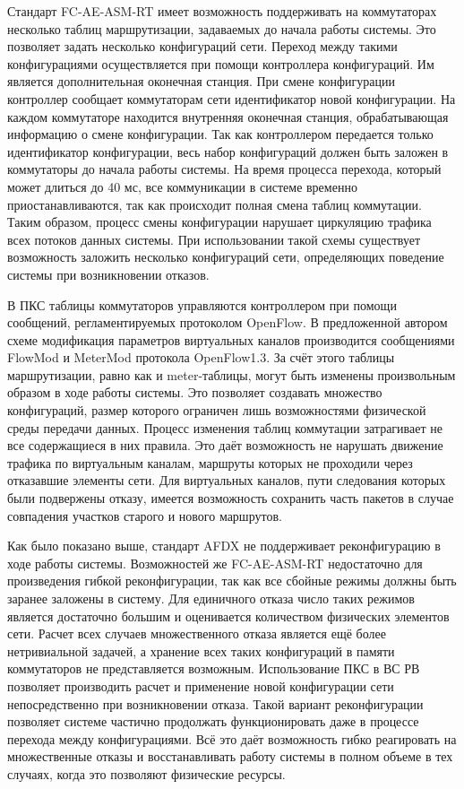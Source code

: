 \documentclass[12pt, a4paper]{article}
\begin{document}
Стандарт FC-AE-ASM-RT имеет возможность поддерживать на коммутаторах несколько таблиц маршрутизации, задаваемых до начала работы системы. Это позволяет задать несколько конфигураций сети. Переход между такими конфигурациями осуществляется при помощи контроллера конфигураций. Им является дополнительная оконечная станция. При смене конфигурации контроллер сообщает коммутаторам сети идентификатор новой конфигурации. На каждом коммутаторе находится внутренняя оконечная станция, обрабатывающая информацию о смене конфигурации. Так как контроллером передается только идентификатор конфигурации, весь набор конфигураций должен быть заложен в коммутаторы до начала работы системы. На время процесса перехода, который может длиться до 40 мс, все коммуникации в системе временно приостанавливаются, так как происходит полная смена таблиц коммутации. Таким образом, процесс смены конфигурации нарушает циркуляцию трафика всех потоков данных системы. При использовании такой схемы существует возможность заложить несколько конфигураций сети, определяющих поведение системы при возникновении отказов.

В ПКС таблицы коммутаторов управляются контроллером при помощи сообщений, регламентируемых протоколом OpenFlow. В предложенной автором схеме модификация параметров виртуальных каналов производится сообщениями FlowMod и MeterMod протокола OpenFlow1.3. За счёт этого таблицы маршрутизации, равно как и meter-таблицы, могут быть изменены произвольным образом в ходе работы системы. Это позволяет создавать множество конфигураций, размер которого ограничен лишь возможностями физической среды передачи данных. Процесс изменения таблиц коммутации затрагивает не все содержащиеся в них правила. Это даёт возможность не нарушать движение трафика по виртуальным каналам, маршруты которых не проходили через отказавшие элементы сети. Для виртуальных каналов, пути следования которых были подвержены отказу, имеется возможность сохранить часть пакетов в случае совпадения участков старого и нового маршрутов. 

Как было показано выше, стандарт AFDX не поддерживает реконфигурацию в ходе работы системы. Возможностей же FC-AE-ASM-RT недостаточно для произведения гибкой реконфигурации, так как все сбойные режимы должны быть заранее заложены в систему. Для единичного отказа число таких режимов является достаточно большим и оценивается количеством физических элементов сети. Расчет всех случаев множественного отказа является ещё более нетривиальной задачей, а хранение всех таких конфигураций в памяти коммутаторов не представляется возможным. Использование ПКС в ВС РВ позволяет производить расчет и применение новой конфигурации сети непосредственно при возникновении отказа. Такой вариант реконфигурации позволяет системе частично продолжать функционировать даже в процессе перехода между конфигурациями. Всё это даёт возможность гибко реагировать на множественные отказы и восстанавливать работу системы в полном объеме в тех случаях, когда это позволяют физические ресурсы.
\end{document}
